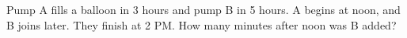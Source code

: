 Pump A fills a balloon in 3 hours and pump B in 5 hours. A begins at noon, and B joins later. They finish at 2 PM. How many minutes after noon was B added?
